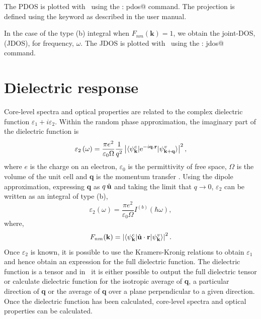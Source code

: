 \documentclass[a4paper,11pt,twoside]{book}
\newcommand{\kbf}{\mathbf{k}}
\newcommand{\e}{\mathrm{e}}
\begin{document}
The PDOS is plotted with \optados\ using the \verb@task : pdos@
command. 
%
The projection is defined using the \verb@pdos@ keyword as described
in the user manual.

In the case of the type (b) integral when $F_{nm}(\kbf)=1$, we
obtain the joint-DOS, (JDOS), for frequency, $\omega$.
%
The JDOS is plotted with \optados\ using the \verb@task : jdos@ command.



\section{Dielectric response}

Core-level spectra and optical properties are related to the complex dielectric function $\varepsilon_1+i\varepsilon_2$.  Within the random phase approximation, the imaginary part of the dielectric function is
\begin{equation}
\varepsilon_2 \left ( \omega \right ) = \frac{\pi e^2}{\varepsilon_0 \Omega} \frac{1}{q^2} \left | \langle  \psi^c_{\bf k}   |  \e^{-i{\bf q}.{\bf r}} | \psi^v_{\bf k + q} \rangle\right |^2,
\end{equation}
where $e$ is the charge on an electron, $\varepsilon_0$ is the permittivity of free space, $\Omega$ is the volume of the unit cell and {\bf q} is the momentum transfer \cite{dressel}.
Using the dipole approximation, expressing {\bf q} as $q\,\hat{\bf{u}}$ and taking the limit that $q \rightarrow 0$, $\varepsilon_2$ can be written as an integral of type (b), 
\begin{equation}
\varepsilon_2 \left ( \omega \right ) = \frac{\pi e^2}{\varepsilon_0 \Omega} I^{(b)}\left ( \hbar \omega \right ), 
\label{Eqn:Epsilon2}
\end{equation}
where,
\begin{equation}
F_{nm}(\kbf)= \left | \langle \psi^c_{\bf k}  |  \hat{\bf u}\cdot {\bf r} | \psi^v_{\bf k} \rangle\right |^2.
\label{Eqn:Dipole}
\end{equation}
Once $\varepsilon_2$ is known, it is possible to use the Kramers-Kronig relations to obtain $\varepsilon_1$ and hence obtain an expression for the full dielectric function.  The dielectric function is a tensor and in \optados\ it is either possible to output the full dielectric tensor or calculate dielectric function for the isotropic average of {\bf q}, a particular direction of {\bf q} or the average of {\bf q} over a plane perpendicular to a given direction.  Once the dielectric function has been calculated, core-level spectra and optical properties can be calculated.  
\end{document}
